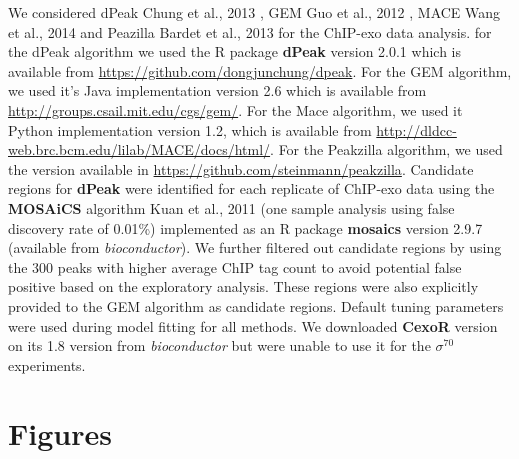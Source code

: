 \documentclass{bmcart}\usepackage[]{graphicx}\usepackage[]{color}
\newcommand{\sig}{\sigma^{70}}
\begin{document}
We considered dPeak Chung et al., 2013 \cite{dpeak}, GEM Guo et al.,
2012 \cite{gem}, MACE Wang et al., 2014 \cite{mace} and Peazilla
Bardet et al., 2013 \cite{peakzilla} for the ChIP-exo data
analysis. for the dPeak algorithm we used the R package \textbf{dPeak}
version 2.0.1 which is available from
\url{https://github.com/dongjunchung/dpeak}. For the GEM algorithm, we
used it's Java implementation version 2.6 which is available from
\url{http://groups.csail.mit.edu/cgs/gem/}. For the Mace algorithm, we
used it Python implementation version 1.2, which is available from
\url{http://dldcc-web.brc.bcm.edu/lilab/MACE/docs/html/}. For the
Peakzilla algorithm, we used the version available in
\url{https://github.com/steinmann/peakzilla}. Candidate regions for
\textbf{dPeak} were identified for each replicate of ChIP-exo data
using the \textbf{MOSAiCS} algorithm Kuan et al., 2011 \cite{mosaics}
(one sample analysis using false discovery rate of 0.01\%)
implemented as an R package \textbf{mosaics} version 2.9.7 (available
from \emph{bioconductor}). We further filtered out candidate regions
by using the 300 peaks with higher average ChIP tag count to
avoid potential false positive based on the exploratory
analysis. These regions were also explicitly provided to the GEM
algorithm as candidate regions. Default tuning parameters were used
during model fitting for all methods. We downloaded \textbf{CexoR}
\cite{cexor} version on its 1.8 version from \emph{bioconductor} but
were unable to use it for the $\sig$ experiments.




\nocite{exo_gb}
\nocite{maplot1}
\nocite{maplot2}
\nocite{chipbeyond}



\newpage

\section{Figures}
\end{document}

